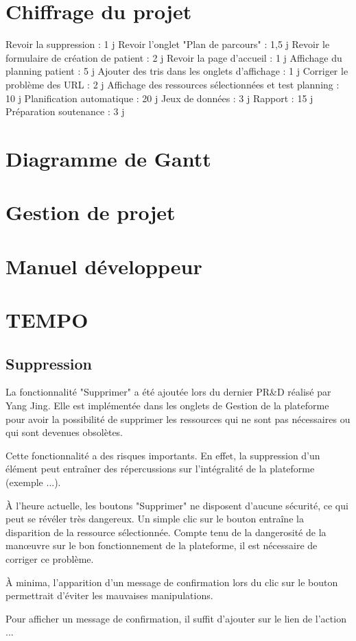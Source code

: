 \documentclass{polytech/polytech}
\begin{document}
\chapter{Chiffrage du projet}

Revoir la suppression : 1 j
Revoir l'onglet "Plan de parcours" : 1,5 j
Revoir le formulaire de création de patient : 2 j
Revoir la page d'accueil : 1 j
Affichage du planning patient : 5 j
Ajouter des tris dans les onglets d'affichage : 1 j
Corriger le problème des URL : 2 j
Affichage des ressources sélectionnées et test planning : 10 j
Planification automatique : 20 j
Jeux de données : 3 j
Rapport : 15 j
Préparation soutenance : 3 j

\chapter{Diagramme de Gantt}

\chapter{Gestion de projet}

\chapter{Manuel développeur}


\chapter{TEMPO}

\section*{Suppression}

La fonctionnalité "Supprimer" a été ajoutée lors du dernier PR\&D réalisé par Yang Jing. Elle est implémentée dans les onglets de Gestion de la plateforme pour avoir la possibilité de supprimer les ressources qui ne sont pas nécessaires ou qui sont devenues obsolètes.  

Cette fonctionnalité a des risques importants. En effet, la suppression d'un élément peut entraîner des répercussions sur l'intégralité de la plateforme (exemple ...). 

À l'heure actuelle, les boutons "Supprimer" ne disposent d'aucune sécurité, ce qui peut se révéler très dangereux. Un simple clic sur le bouton entraîne la disparition de la ressource sélectionnée. Compte tenu de la dangerosité de la manœuvre sur le bon fonctionnement de la plateforme, il est nécessaire de corriger ce problème. 

À minima, l'apparition d'un message de confirmation lors du clic sur le bouton permettrait d'éviter les mauvaises manipulations. 

Pour afficher un message de confirmation, il suffit d'ajouter  sur le lien de l'action ...
\end{document}
